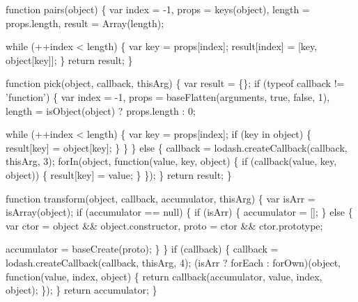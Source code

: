 \begin{DoxyCodeInclude}
    \textcolor{keyword}{function} pairs(\textcolor{keywordtype}{object}) \{
      var index = -1,
          props = keys(\textcolor{keywordtype}{object}),
          length = props.length,
          result = Array(length);

      \textcolor{keywordflow}{while} (++index < length) \{
        var key = props[index];
        result[index] = [key, \textcolor{keywordtype}{object}[key]];
      \}
      \textcolor{keywordflow}{return} result;
    \}

    \textcolor{keyword}{function} pick(\textcolor{keywordtype}{object}, callback, thisArg) \{
      var result = \{\};
      \textcolor{keywordflow}{if} (typeof callback != \textcolor{stringliteral}{'function'}) \{
        var index = -1,
            props = baseFlatten(arguments, \textcolor{keyword}{true}, \textcolor{keyword}{false}, 1),
            length = isObject(\textcolor{keywordtype}{object}) ? props.length : 0;

        \textcolor{keywordflow}{while} (++index < length) \{
          var key = props[index];
          \textcolor{keywordflow}{if} (key in \textcolor{keywordtype}{object}) \{
            result[key] = \textcolor{keywordtype}{object}[key];
          \}
        \}
      \} \textcolor{keywordflow}{else} \{
        callback = lodash.createCallback(callback, thisArg, 3);
        forIn(\textcolor{keywordtype}{object}, \textcolor{keyword}{function}(value, key, \textcolor{keywordtype}{object}) \{
          \textcolor{keywordflow}{if} (callback(value, key, \textcolor{keywordtype}{object})) \{
            result[key] = value;
          \}
        \});
      \}
      \textcolor{keywordflow}{return} result;
    \}

    \textcolor{keyword}{function} transform(\textcolor{keywordtype}{object}, callback, accumulator, thisArg) \{
      var isArr = isArray(\textcolor{keywordtype}{object});
      \textcolor{keywordflow}{if} (accumulator == null) \{
        \textcolor{keywordflow}{if} (isArr) \{
          accumulator = [];
        \} \textcolor{keywordflow}{else} \{
          var ctor = \textcolor{keywordtype}{object} && \textcolor{keywordtype}{object}.constructor,
              proto = ctor && ctor.prototype;

          accumulator = baseCreate(proto);
        \}
      \}
      \textcolor{keywordflow}{if} (callback) \{
        callback = lodash.createCallback(callback, thisArg, 4);
        (isArr ? forEach : forOwn)(\textcolor{keywordtype}{object}, \textcolor{keyword}{function}(value, index, \textcolor{keywordtype}{object}) \{
          \textcolor{keywordflow}{return} callback(accumulator, value, index, \textcolor{keywordtype}{object});
        \});
      \}
      \textcolor{keywordflow}{return} accumulator;
    \}


\end{DoxyCodeInclude}
